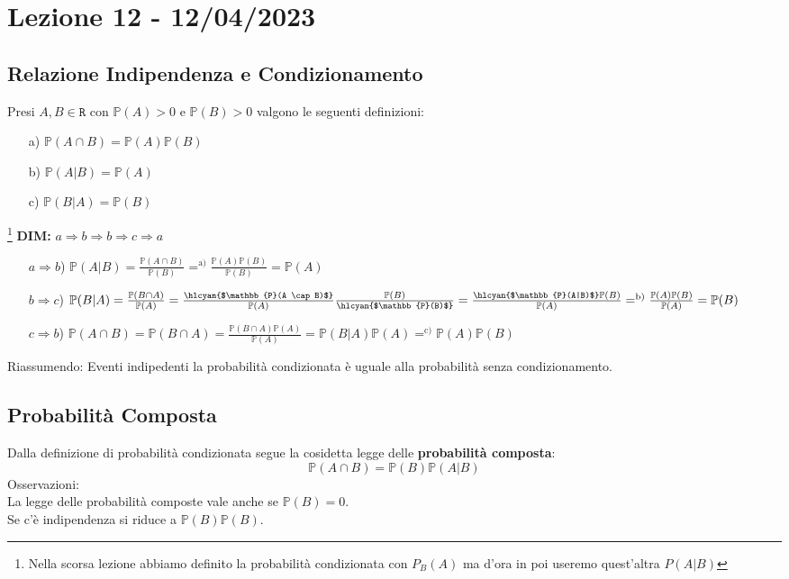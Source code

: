 \section{Lezione 12 - 12/04/2023}

\subsection{Relazione Indipendenza e Condizionamento}
Presi $A,B \in \mathtt{R}$ con $\mathbb{P}(A) > 0$ e $\mathbb{P}(B) > 0$ valgono le seguenti definizioni:
\begin{itemize}
\item[a)] $\mathbb{P}(A \cap B) = \mathbb{P}(A) \mathbb{P}(B)$
\item[b)] $\mathbb{P}(A|B) = \mathbb{P}(A)$
\item[c)] $\mathbb{P}(B|A) = \mathbb{P}(B)$
\end{itemize}
\footnote{Nella scorsa lezione abbiamo definito la probabilità condizionata con $P_B(A)$ ma d'ora in poi useremo quest'altra $P(A|B)$}
\textbf{DIM:} $ a \Rightarrow b \Rightarrow b \Rightarrow c \Rightarrow a$
\begin{itemize}
\item[$a \Rightarrow b$)] $\mathbb{P}(A|B) = \frac{\mathbb{P}(A \cap B)}{\mathbb{P}(B)} =^\text{a)} \frac{\mathbb{P}(A) \mathbb{P}(B)}{\mathbb{P}(B)} = \mathbb{P}(A)$

\item[$b \Rightarrow c$)]$ \mathbb{P}(B|A) =  \frac{\mathbb{P}(B \cap A)}{\mathbb{P}(A)} = \frac{\text{\hlcyan{$\mathbb{P}(A \cap B)$}}}{\mathbb{P}(A)} \frac{\mathbb{P}(B)}{\text{\hlcyan{$\mathbb{P}(B)$}}} = \frac{\text{\hlcyan{$\mathbb{P}(A|B)$}} \mathbb{P}(B)}{\mathbb{P}(A)} =^\text{b)} \frac{\mathbb{P}(A) \mathbb{P}(B)}{\mathbb{P}(A)} = \mathbb{P}(B)$

\item[$c \Rightarrow b$)] $ \mathbb{P}(A \cap B) = \mathbb{P}(B \cap A) = \frac{\mathbb{P}(B \cap A) \mathbb{P}(A)}{\mathbb{P}(A)} = \mathbb{P}(B|A) \mathbb{P}(A) =^\text{c)} \mathbb{P}(A) \mathbb{P}(B)$

\end{itemize}

Riassumendo: Eventi indipedenti la probabilità condizionata è uguale alla probabilità senza condizionamento.\\

\subsection{Probabilità Composta}
Dalla definizione di probabilità condizionata segue la cosidetta legge delle \textbf{probabilità composta}:
$$ \mathbb{P}(A \cap B) = \mathbb{P}(B) \mathbb{P}(A|B)  $$
Osservazioni:\\
La legge delle probabilità composte vale anche se $\mathbb{P}(B) = 0$.\\
Se c'è indipendenza si riduce a $\mathbb{P}(B) \mathbb{P}(B)$.\\
